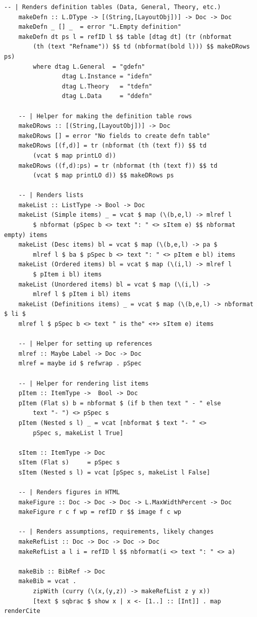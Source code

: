 \begin{lstlisting}[language=haskell1, 
	basicstyle=\linespread{1.1}\small\ttfamily]
	-- | Renders definition tables (Data, General, Theory, etc.)
	makeDefn :: L.DType -> [(String,[LayoutObj])] -> Doc -> Doc
	makeDefn _ [] _  = error "L.Empty definition"
	makeDefn dt ps l = refID l $$ table [dtag dt] (tr (nbformat 
		(th (text "Refname")) $$ td	(nbformat(bold l))) $$ makeDRows ps)
		where dtag L.General  = "gdefn"
			    dtag L.Instance = "idefn"
			    dtag L.Theory   = "tdefn"
			    dtag L.Data     = "ddefn"
	
	-- | Helper for making the definition table rows
	makeDRows :: [(String,[LayoutObj])] -> Doc
	makeDRows [] = error "No fields to create defn table"
	makeDRows [(f,d)] = tr (nbformat (th (text f)) $$ td 
		(vcat $ map printLO d))
	makeDRows ((f,d):ps) = tr (nbformat (th (text f)) $$ td 
		(vcat $ map printLO d)) $$ makeDRows ps
	
	-- | Renders lists
	makeList :: ListType -> Bool -> Doc
	makeList (Simple items) _ = vcat $ map (\(b,e,l) -> mlref l 
		$ nbformat (pSpec b <> text ": " <> sItem e) $$ nbformat empty) items
	makeList (Desc items) bl = vcat $ map (\(b,e,l) -> pa $
		mlref l $ ba $ pSpec b <> text ": " <> pItem e bl) items
	makeList (Ordered items) bl = vcat $ map (\(i,l) -> mlref l 
		$ pItem i bl) items
	makeList (Unordered items) bl = vcat $ map (\(i,l) -> 
		mlref l $ pItem i bl) items
	makeList (Definitions items) _ = vcat $ map (\(b,e,l) -> nbformat $ li $ 
	mlref l $ pSpec b <> text " is the" <+> sItem e) items
	
	-- | Helper for setting up references
	mlref :: Maybe Label -> Doc -> Doc
	mlref = maybe id $ refwrap . pSpec
	
	-- | Helper for rendering list items
	pItem :: ItemType ->  Bool -> Doc
	pItem (Flat s) b = nbformat $ (if b then text " - " else 
		text "- ") <> pSpec s
	pItem (Nested s l) _ = vcat [nbformat $ text "- " <> 
		pSpec s, makeList l True]
		
	sItem :: ItemType -> Doc
	sItem (Flat s)     = pSpec s
	sItem (Nested s l) = vcat [pSpec s, makeList l False]
	
	-- | Renders figures in HTML
	makeFigure :: Doc -> Doc -> Doc -> L.MaxWidthPercent -> Doc
	makeFigure r c f wp = refID r $$ image f c wp
	
	-- | Renders assumptions, requirements, likely changes
	makeRefList :: Doc -> Doc -> Doc -> Doc
	makeRefList a l i = refID l $$ nbformat(i <> text ": " <> a)
	
	makeBib :: BibRef -> Doc
	makeBib = vcat .
		zipWith (curry (\(x,(y,z)) -> makeRefList z y x))
		[text $ sqbrac $ show x | x <- [1..] :: [Int]] . map renderCite
\end{lstlisting}

